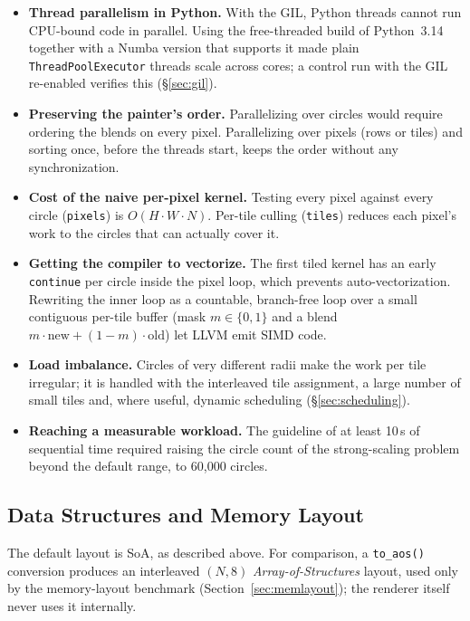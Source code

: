 \documentclass[10pt,twocolumn,letterpaper]{article}
\begin{document}
\begin{itemize}[itemsep=1pt,topsep=2pt]
  \item \textbf{Thread parallelism in Python.} With the GIL, Python threads
    cannot run CPU-bound code in parallel. Using the free-threaded build of
    Python~3.14 together with a Numba version that supports it made plain
    \texttt{ThreadPoolExecutor} threads scale across cores; a control run
    with the GIL re-enabled verifies this (\S\ref{sec:gil}).
  \item \textbf{Preserving the painter's order.} Parallelizing over circles
    would require ordering the blends on every pixel. Parallelizing over
    pixels (rows or tiles) and sorting once, before the threads start, keeps
    the order without any synchronization.
  \item \textbf{Cost of the naive per-pixel kernel.} Testing every pixel
    against every circle (\texttt{pixels}) is $O(H\cdot W\cdot N)$. Per-tile
    culling (\texttt{tiles}) reduces each pixel's work to the circles that
    can actually cover it.
  \item \textbf{Getting the compiler to vectorize.} The first tiled kernel
    has an early \texttt{continue} per circle inside the pixel loop, which
    prevents auto-vectorization. Rewriting the inner loop as a countable,
    branch-free loop over a small contiguous per-tile buffer (mask
    $m\in\{0,1\}$ and a blend $m\cdot\text{new}+(1-m)\cdot\text{old}$)
    let LLVM emit SIMD code.
  \item \textbf{Load imbalance.} Circles of very different radii make the
    work per tile irregular; it is handled with the interleaved tile
    assignment, a large number of small tiles and, where useful, dynamic
    scheduling (\S\ref{sec:scheduling}).
  \item \textbf{Reaching a measurable workload.} The guideline of at least
    10\,s of sequential time required raising the circle count of the
    strong-scaling problem beyond the default range, to 60{,}000 circles.
\end{itemize}

\subsection{Data Structures and Memory Layout}

The default layout is SoA, as described above. For comparison, a
\texttt{to\_aos()} conversion produces an interleaved $(N,8)$
\emph{Array-of-Structures} layout, used only by the memory-layout benchmark
(Section~\ref{sec:memlayout}); the renderer itself never uses it internally.
\end{document}

